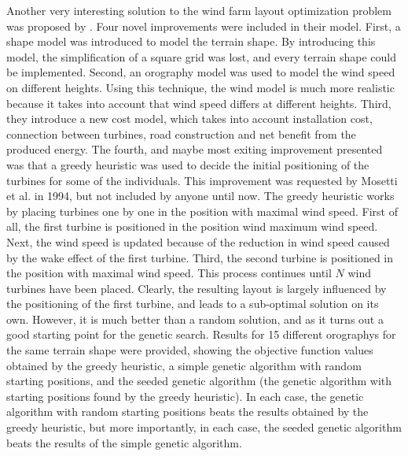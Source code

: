 \noindent Another very interesting solution to the wind farm layout optimization problem was proposed by \cite{Saavedra-Morena}. Four novel improvements were included in their model. First, a shape model was introduced to model the terrain shape. By introducing this model, the simplification of a square grid was lost, and every terrain shape could be implemented. Second, an orography model was used to model the wind speed on different heights. Using this technique, the wind model is much more realistic because it takes into account that wind speed differs at different heights. Third, they introduce a new cost model, which takes into account installation cost, connection between turbines, road construction and net benefit from the produced energy. The fourth, and maybe most exiting improvement presented  was that a greedy heuristic was used to decide the initial positioning of the turbines for some of the individuals. This improvement was requested by Mosetti et al. in 1994, but not included by anyone until now. The greedy heuristic works by placing turbines one by one in the position with maximal wind speed. First of all, the first turbine is positioned in the position wind maximum wind speed. Next, the wind speed is updated because of the reduction in wind speed caused by the wake effect of the first turbine. Third, the second turbine is positioned in the position with maximal wind speed. This process continues until $N$ wind turbines have been placed. Clearly, the resulting layout is largely influenced by the positioning of the first turbine, and leads to a sub-optimal solution on its own. However, it is much better than a random solution, and as it turns out a good starting point for the genetic search. Results for 15 different orographys for the same terrain shape were provided, showing the objective function values obtained by the greedy heuristic, a simple genetic algorithm with random starting positions, and the seeded genetic algorithm (the genetic algorithm with starting positions found by the greedy heuristic). In each case, the genetic algorithm with random starting positions beats the results obtained by the greedy heuristic, but more importantly, in each case, the seeded genetic algorithm beats the results of the simple genetic algorithm. \\


